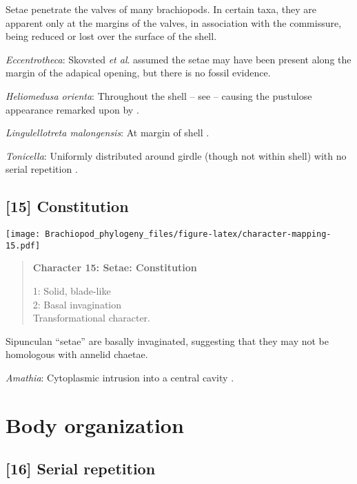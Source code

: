 \documentclass[openany]{book}
\theoremstyle{definition}
\theoremstyle{definition}
\theoremstyle{definition}
\theoremstyle{remark}
\begin{document}
Setae penetrate the valves of many brachiopods. In certain taxa, they
are apparent only at the margins of the valves, in association with the
commissure, being reduced or lost over the surface of the shell.

\hypertarget{Eccentrotheca-coding-14}{}
\emph{Eccentrotheca}: Skovsted \emph{et al}.
\citeyearpar{Skovsted2011Scleritomeconstruction} assumed the setae may
have been present along the margin of the adapical opening, but there is
no fossil evidence.

\hypertarget{Heliomedusa_orienta-coding-14}{}
\emph{Heliomedusa orienta}: Throughout the shell -- see
\citet{Williams2007Supplement} -- causing the pustulose appearance
remarked upon by \citet{Chen2007Reinterpretationof}.

\hypertarget{Lingulellotreta_malongensis-coding-14}{}
\emph{Lingulellotreta malongensis}: At margin of shell
\citep{Zhang2005}.

\hypertarget{Tonicella-coding-14}{}
\emph{Tonicella}: Uniformly distributed around girdle (though not within
shell) with no serial repetition \citep{Vinther2005, Leise1988}.

\subsection*{{[}15{]} Constitution}\label{constitution}

\texttt{[image: Brachiopod\_phylogeny\_files/figure-latex/character-mapping-15.pdf]}

\begin{quote}
\textbf{Character 15: Setae: Constitution}

1: Solid, blade-like\\
2: Basal invagination\\
Transformational character.
\end{quote}

Sipunculan ``setae'' are basally invaginated, suggesting that they may
not be homologous with annelid chaetae.

\hypertarget{Amathia-coding-15}{}
\emph{Amathia}: Cytoplasmic intrusion into a central cavity
\citep{Gordon1975}.

\section{Body organization}\label{body-organization}

\subsection*{{[}16{]} Serial repetition}\label{serial-repetition}
\end{document}
